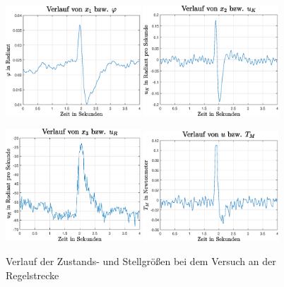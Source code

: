 \begin{figure}[h!]
\centering
\includegraphics[width=0.45\textwidth]{img/edge_exp1_phi.eps}\hspace{0.7cm}
\includegraphics[width=0.45\textwidth]{img/edge_exp1_uk.eps}
\vspace{0.5cm}

\includegraphics[width=0.45\textwidth]{img/edge_exp1_ur.eps}\hspace{0.7cm}
\includegraphics[width=0.45\textwidth]{img/edge_exp1_tm.eps}\caption{Verlauf der Zustands- und Stellgrößen bei dem Versuch an der Regelstrecke}
\end{figure}
\pagebreak

